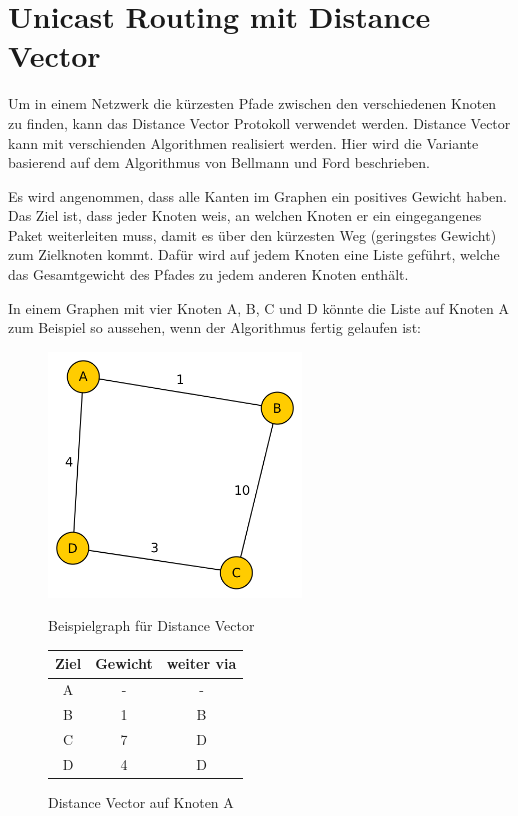 \section{Unicast Routing mit Distance Vector}
Um in einem Netzwerk die kürzesten Pfade zwischen den verschiedenen Knoten zu finden, kann das Distance Vector Protokoll verwendet werden. Distance Vector kann mit verschienden Algorithmen realisiert werden. Hier wird die Variante basierend auf dem Algorithmus von Bellmann und Ford \cite{wiki:bellmannFord} beschrieben.

Es wird angenommen, dass alle Kanten im Graphen ein positives Gewicht haben.
Das Ziel ist, dass jeder Knoten weis, an welchen Knoten er ein eingegangenes Paket weiterleiten muss, damit es über den kürzesten Weg (geringstes Gewicht) zum Zielknoten kommt.
Dafür wird auf jedem Knoten eine Liste geführt, welche das Gesamtgewicht des Pfades zu jedem anderen Knoten enthält.

In einem Graphen mit vier Knoten A, B, C und D könnte die Liste auf Knoten A zum Beispiel so aussehen, wenn der Algorithmus fertig gelaufen ist:

\begin{figure}[ht]
	\centering
		\begin{minipage}[b]{0.45\linewidth}
			\includegraphics[width=0.6\textwidth]{bilder/distance_vector_example.png}
			\caption{Beispielgraph für Distance Vector}
		\end{minipage}
	\quad
		\begin{minipage}[b]{0.45\linewidth}
			\begin{center}
			\begin{tabular}{ |c|c|c| }
		 	\hline
		 	Ziel & Gewicht & weiter via  \\ 
		 	\hline
		 	A    & -       & -  \\ 
		 	B    & 1       & B  \\ 
		 	C    & 7       & D  \\ 
		 	D    & 4       & D  \\ 
		 	\hline
			\end{tabular}
			\end{center}
		\caption{Distance Vector auf Knoten A}
		\end{minipage}
\end{figure}



